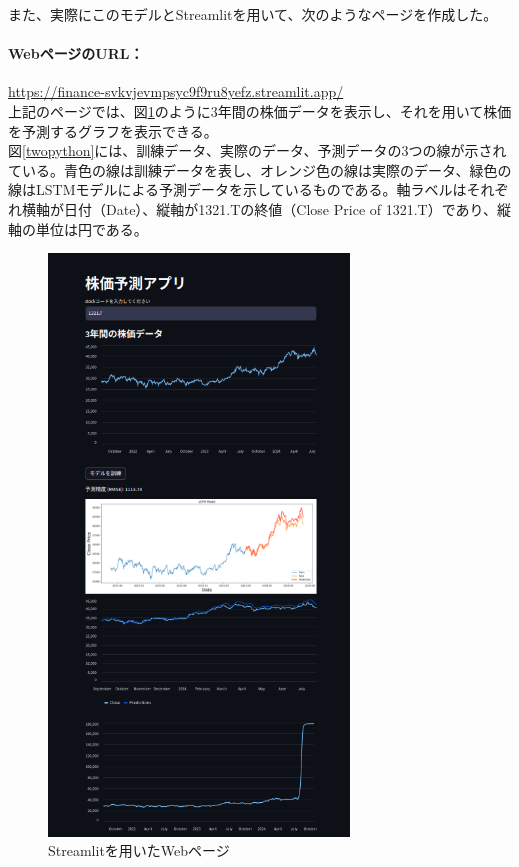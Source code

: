 \documentclass[a4paper, 11pt, titlepage]{jsarticle}
\begin{document}
\indent また、実際にこのモデルとStreamlitを用いて、次のようなページを作成した。\\
\paragraph{WebページのURL：}\url{https://finance-svkvjevmpsyc9f9ru8yefz.streamlit.app/} \\

\indent 上記のページでは、図\ref{Streamlit}のように3年間の株価データを表示し、それを用いて株価を予測するグラフを表示できる。 \\
\indent 図\ref{twopython}には、訓練データ、実際のデータ、予測データの3つの線が示されている。青色の線は訓練データを表し、オレンジ色の線は実際のデータ、緑色の線はLSTMモデルによる予測データを示しているものである。軸ラベルはそれぞれ横軸が日付（Date）、縦軸が1321.Tの終値（Close Price of 1321.T）であり、縦軸の単位は円である。

\begin{figure}[htbp]
  \centering
  \includegraphics[width=80mm]{./image/image.png}
  \caption{Streamlitを用いたWebページ}
  \label{Streamlit}
\end{figure}
\clearpage
\end{document}
